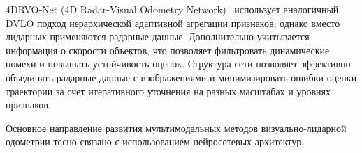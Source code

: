 4DRVO-Net (4D Radar-Visual Odometry Network)~\cite{zhuo20234drvo} использует аналогичный DVLO подход 
иерархической адаптивной агрегации признаков, однако вместо лидарных применяются 
радарные данные. Дополнительно учитывается информация о скорости объектов, что 
позволяет фильтровать динамические помехи и повышать устойчивость оценок. 
Структура сети позволяет эффективно объединять радарные данные с изображениями 
и минимизировать ошибки оценки траектории за счет итеративного уточнения на разных 
масштабах и уровнях признаков.

Основное направление развития мультимодальных методов визуально-лидарной одометрии
тесно связано с использованием нейросетевых архитектур.


